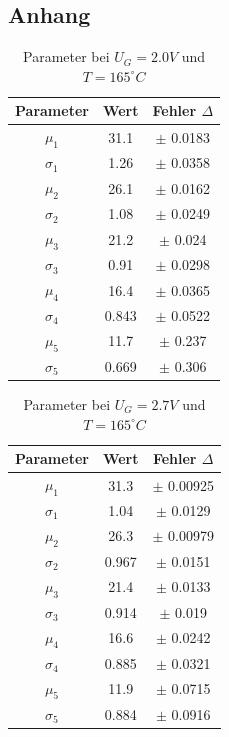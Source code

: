 \documentclass{article}
\begin{document}
\begin{multicols}{2}
\section{Anhang}
\begin{table}[H]
  \centering
  \begin{tabular}{|c|c|c|}
      \hline
      Parameter & Wert & Fehler $\Delta$ \\ \hline
      $\mu_1$ & 31.1 & $\pm$ 0.0183 \\ \hline
      $\sigma_1$& 1.26 & $\pm$ 0.0358 \\ \hline
      $\mu_2$ & 26.1 & $\pm$ 0.0162 \\ \hline
      $\sigma_2$ & 1.08 & $\pm$ 0.0249 \\ \hline
      $\mu_3$ & 21.2 & $\pm$ 0.024 \\ \hline
      $\sigma_3$ & 0.91 & $\pm$ 0.0298 \\ \hline
      $\mu_4$ & 16.4 & $\pm$ 0.0365 \\ \hline
      $\sigma_4$ & 0.843 & $\pm$ 0.0522 \\ \hline
      $\mu_5$ & 11.7 & $\pm$ 0.237 \\ \hline
      $\sigma_5$ & 0.669 & $\pm$ 0.306 \\ \hline
  \end{tabular}
  \caption{Parameter bei $U_G=2.0V$ und $T=165^\circ C$}
  \label{tab:data_no_height}
\end{table}
\begin{table}[H]
  \centering
  \begin{tabular}{|c|c|c|}
      \hline
      Parameter & Wert & Fehler $\Delta$ \\ \hline
      $\mu_1$ & 31.3 & $\pm$ 0.00925 \\ \hline
      $\sigma_1$ & 1.04 & $\pm$ 0.0129 \\ \hline
      $\mu_2$ & 26.3 & $\pm$ 0.00979 \\ \hline
      $\sigma_2$ & 0.967 & $\pm$ 0.0151 \\ \hline
      $\mu_3$ & 21.4 & $\pm$ 0.0133 \\ \hline
      $\sigma_3$ & 0.914 & $\pm$ 0.019 \\ \hline
      $\mu_4$ & 16.6 & $\pm$ 0.0242 \\ \hline
      $\sigma_4$ & 0.885 & $\pm$ 0.0321 \\ \hline
      $\mu_5$ & 11.9 & $\pm$ 0.0715 \\ \hline
      $\sigma_5$ & 0.884 & $\pm$ 0.0916 \\ \hline
  \end{tabular}
  \caption{Parameter bei $U_G=2.7V$ und $T=165^\circ C$}
  \label{tab:data_no_height_2}
\end{table}


\end{multicols}
\end{document}
